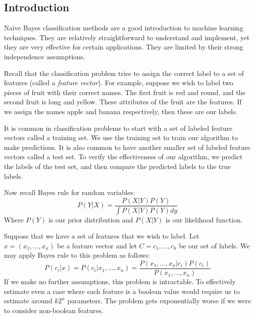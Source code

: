\label{Ch:NaiveBayes}



%
%	
%	
%	
%

\subsection*{Introduction}

Naive Bayes classification methods are a good introduction to machine learning techniques.
They are relatively straightforward to understand and implement, yet they are very effective for certain applications.
They are limited by their strong independence assumptions.

Recall that the classification problem tries to assign the correct label to a set of features 
(called a \emph{feature vector}).
For example, suppose we wish to label two pieces of fruit with their correct names.
The first fruit is red and round, and the second fruit is long and yellow.
These attributes of the fruit are the features.
If we assign the names apple and banana respectively, then these are our labels.

It is common in classification problems to start with a set of labeled feature vectors called a training set.
We use the training set to train our algorithm to make predictions.
It is also common to have another smaller set of labeled feature vectors called a test set.
To verify the effectiveness of our algorithm, we predict the labels of the test set, and then compare the predicted labels to the true labels.

Now recall Bayes rule for random variables:
\[
P(Y|X) = \frac{P(X|Y)P(Y)}{\int P(X|Y)P(Y) dy}
\]
Where $P(Y)$ is our prior distribution and $P(X|Y)$ is our likelihood function.

Suppose that we have a set of features that we wish to label.
Let $x = (x_1, \ldots, x_n)$ be a feature vector and let $C = {c_1, \ldots, c_k}$ be our set of labels.
We may apply Bayes rule to this problem as follows:
\[
P(c_i|x) = P(c_i | x_1, \ldots, x_n)  = \frac{P(x_1, \ldots, x_n|c_i)P(c_i)}{P(x_1, \ldots, x_n)}
\]
If we make no further assumptions, this problem is intractable.
To effectively estimate even a case where each feature is a boolean value would require us to estimate around $k2^{n}$ parameters.
The problem gets exponentially worse if we were to consider non-boolean features.

